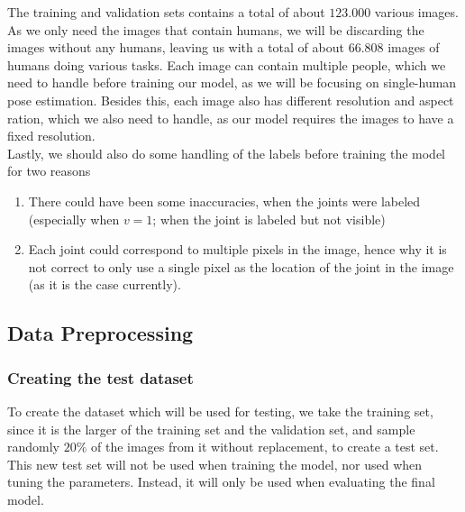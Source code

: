 \documentclass[main.tex]{subfiles}
\begin{document}
The training and validation sets contains a total of about $123.000$ various images. As we only need the images that contain humans, we will be discarding the images without any humans, leaving us with a total of about $66.808$ images of humans doing various tasks. Each image can contain multiple people, which we need to handle before training our model, as we will be focusing on single-human pose estimation. Besides this, each image also has different resolution and aspect ration, which we also need to handle, as our model requires the images to have a fixed resolution. \\
Lastly, we should also do some handling of the labels before training the model for two reasons
\begin{enumerate}
    \item There could have been some inaccuracies, when the joints were labeled (especially when $v = 1$; when the joint is labeled but not visible)
    \item Each joint could correspond to multiple pixels in the image, hence why it is not correct to only use a single pixel as the location of the joint in the image (as it is the case currently).
\end{enumerate}

\subsection{Data Preprocessing}
\subsubsection{Creating the test dataset}
To create the dataset which will be used for testing, we take the training set, since it is the larger of the training set and the validation set, and sample randomly $20 \%$ of the images from it without replacement, to create a test set. This new test set will not be used when training the model, nor used when tuning the parameters. Instead, it will only be used when evaluating the final model. 
\end{document}
